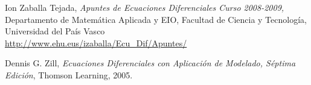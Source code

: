 

\begin{thebibliography}{9}
Ion Zaballa Tejada, \textit{Apuntes de Ecuaciones Diferenciales Curso 2008-2009,} Departamento de Matemática Aplicada y EIO, Facultad de Ciencia y Tecnología, Universidad del País Vasco
\\\url{http://www.ehu.eus/izaballa/Ecu_Dif/Apuntes/}

Dennis G. Zill, \textit{Ecuaciones Diferenciales con Aplicación de Modelado, Séptima Edición}, Thomson Learning, 2005. 


\end{thebibliography}

